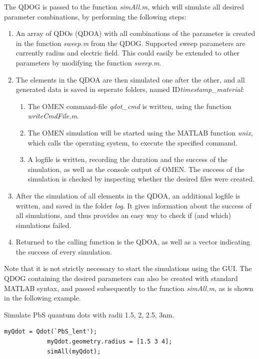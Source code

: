 		The QDOG is passed to the function \textit{simAll.m}, which will simulate all desired parameter combinations, by performing the following steps:
		\begin{enumerate}
			\item An array of QDOs (QDOA) with all combinations of the parameter is created in the function \textit{sweep.m} from the QDOG. Supported sweep parameters are currently radius and electric field. This could easily be extended to other parameters by modifying the function \textit{sweep.m}.
			\item The elements in the QDOA are then simulated one after the other, and all generated data is saved in seperate folders, named ID\textit{timestamp\_material}: 
			\begin{enumerate}
				\item The OMEN command-file \textit{qdot\_cmd} is written, using the function \textit{writeCmdFile.m}.
				\item The OMEN simulation will be started using the MATLAB function \textit{unix}, which calls the operating system, to execute the specified command.
				\item A logfile is written, recording the duration and the success of the simulation, as well as the console output of OMEN. The success of the simulation is checked by inspecting whether the desired files were created.
			\end{enumerate}
		\item After the simulation of all elements in the QDOA, an additional logfile is written, and saved in the folder \textit{log}. It gives information about the success of all simulations, and thus provides an easy way to check if (and which) simulations failed.
		\item Returned to the calling function is the QDOA, as well as a vector indicating the success of every simulation.
		\end{enumerate}
		
		Note that it is not strictly necessary to start the simulations using the GUI. The QDOG containing the desired parameters can also be created with standard MATLAB syntax, and passed subsequently to the function \textit{simAll.m}, as is shown in the following example.\\
		
		\begin{EXAMPLE} Simulate PbS  quantum dots with radii 1.5, 2, 2.5, 3nm. 
		\begin{lstlisting}[frame = none]
			myQdot = Qdot(`PbS_lent');
			myQdot.geometry.radius = [1.5 3 4]; 
			simAll(myQdot);\end{lstlisting}
		\end{EXAMPLE}
					
